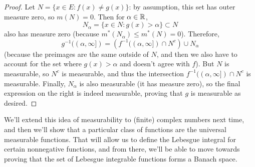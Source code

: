 \begin{proof}
Let $N = \{x \in E: f(x) \ne g(x)\}$: by assumption, this set has outer measure zero, so $m(N) = 0$. Then for $\alpha \in \mathbb R$, 
\[
    N_{\alpha} = \{x \in N: g(x) > \alpha\} \subset N
\]
also has measure zero (because $m^\ast(N_\alpha) \le m^\ast(N) = 0$). Therefore, 
\[
    g^{-1}((\alpha, \infty]) = \left(f^{-1}((\alpha, \infty]) \cap N^c\right) \cup N_\alpha
\]
(because the preimages are the same outside of $N$, and then we also have to account for the set where $g(x) > \alpha$ and doesn't agree with $f$). But $N$ is measurable, so $N^c$ is measurable, and thus the intersection $f^{-1}((\alpha, \infty]) \cap N^c$ is measurable. Finally, $N_\alpha$ is also measurable (it has measure zero), so the final expression on the right is indeed measurable, proving that $g$ is measurable as desired.
\end{proof}


We'll extend this idea of measurability to (finite) complex numbers next time, and then we'll show that a particular class of functions are the universal measurable functions. That will allow us to define the Lebesgue integral for certain nonnegative functions, and from there, we'll be able to move towards proving that the set of Lebesgue integrable functions forms a Banach space.